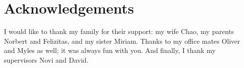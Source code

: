 

\begingroup
\let\clearpage\relax
\let\cleardoublepage\relax
\let\cleardoublepage\relax
\chapter*{Acknowledgements}
I would like to thank my family for their support:
my wife Chao, my parents Norbert and Felizitas, and my sister Miriam.
Thanks to my office mates Oliver and Myles as well; it was always fun with you.
And finally, I thank my supervisors Novi and David.

\endgroup
